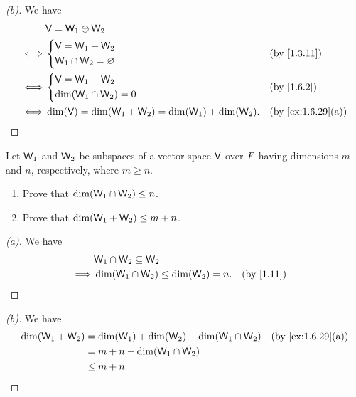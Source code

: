\begin{proof}[(b)]
  We have
  \begin{align*}
         & \V = \W_1 \oplus \W_2                                                          \\
    \iff & \begin{dcases}
             \V = \W_1 + \W_2 \\
             \W_1 \cap \W_2 = \varnothing
           \end{dcases}                            &  & \by{1.3.11}                       \\
    \iff & \begin{dcases}
             \V = \W_1 + \W_2 \\
             \dim(\W_1 \cap \W_2) = 0
           \end{dcases}                                &  & \by{1.6.2}                    \\
    \iff & \dim(\V) = \dim(\W_1 + \W_2) = \dim(\W_1) + \dim(\W_2). &  & \by{ex:1.6.29}[a]
  \end{align*}
\end{proof}

\setcounter{ex}{30}
\begin{ex}\label{ex:1.6.31}
  Let \(\mathsf{W}_1\) and \(\mathsf{W}_2\) be subspaces of a vector space \(\mathsf{V}\) over \(\mathit{F}\) having dimensions \(m\) and \(n\), respectively, where \(m \geq n\).
  \begin{enumerate}
    \item Prove that \(\dim(\mathsf{W}_1 \cap \mathsf{W}_2) \leq n\).
    \item Prove that \(\dim(\mathsf{W}_1 + \mathsf{W}_2) \leq m + n\).
  \end{enumerate}
\end{ex}

\begin{proof}[(a)]
  We have
  \begin{align*}
             & \W_1 \cap \W_2 \subseteq \W_2                            \\
    \implies & \dim(\W_1 \cap \W_2) \leq \dim(\W_2) = n. &  & \by{1.11}
  \end{align*}
\end{proof}

\begin{proof}[(b)]
  We have
  \begin{align*}
    \dim(\W_1 + \W_2) & = \dim(\W_1) + \dim(\W_2) - \dim(\W_1 \cap \W_2) &  & \by{ex:1.6.29}[a] \\
                      & = m + n - \dim(\W_1 \cap \W_2)                                          \\
                      & \leq m + n.
  \end{align*}
\end{proof}

